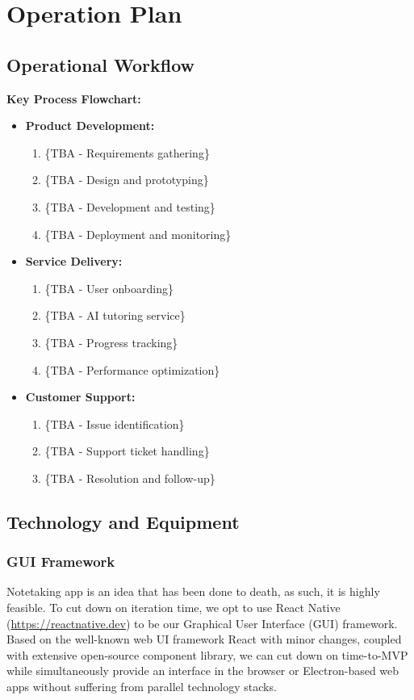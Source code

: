 \section{Operation Plan}

\subsection{Operational Workflow}
\textbf{Key Process Flowchart:}
\begin{itemize}
    \item \textbf{Product Development:}
    \begin{enumerate}
        \item \{TBA - Requirements gathering\}
        \item \{TBA - Design and prototyping\}
        \item \{TBA - Development and testing\}
        \item \{TBA - Deployment and monitoring\}
    \end{enumerate}
    \item \textbf{Service Delivery:}
    \begin{enumerate}
        \item \{TBA - User onboarding\}
        \item \{TBA - AI tutoring service\}
        \item \{TBA - Progress tracking\}
        \item \{TBA - Performance optimization\}
    \end{enumerate}
    \item \textbf{Customer Support:}
    \begin{enumerate}
        \item \{TBA - Issue identification\}
        \item \{TBA - Support ticket handling\}
        \item \{TBA - Resolution and follow-up\}
    \end{enumerate}
\end{itemize}

\subsection{Technology and Equipment}
\subsubsection{GUI Framework}
Notetaking app is an idea that has been done to death, as such, it is highly feasible. To cut down on
 iteration time, we opt to use React Native (\url{https://reactnative.dev}) to be our Graphical User Interface
 (GUI) framework. Based on the well-known web UI framework React with minor changes, coupled with extensive open-source
 component library, we can cut down on time-to-MVP while simultaneously provide an interface in the browser or
 Electron-based web apps without suffering from parallel technology stacks.

